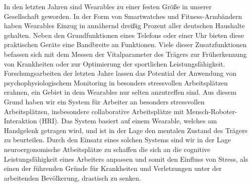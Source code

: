 

In den letzten Jahren sind Wearables zu einer festen Größe in unserer Gesellschaft geworden. In der Form von Smartwatches und Fitness-Armbändern haben Wearables Einzug in annähernd dreißig Prozent aller deutschen Haushalte gehalten. Neben den Grundfunktionen eines Telefons oder einer Uhr bieten diese praktischen Geräte eine Bandbreite an Funktionen. Viele dieser Zusatzfunktionen befassen sich mit dem Messen der Vitalparameter des Trägers zur Früherkennung von Krankheiten oder zur Optimierung der sportlichen Leistungsfähigkeit.
Forschungsarbeiten der letzten Jahre lassen das Potential der Anwendung von psychophysiologischem Monitoring in besonders stressvollen Arbeitsplätzen erahnen, ein Gebiet in dem Wearables nur selten anzutreffen sind.
Aus diesem Grund haben wir ein System für Arbeiter an besonders stressvollen Arbeitsplätzen, insbesondere collaborative Arbeitsplätze mit Mensch-Roboter-Interaktion (HRI). Das System basiert auf einem Wearable, welches am Handgelenk getragen wird, und ist in der Lage den mentalen Zustand des Trägers zu beurteilen.
Durch den Einsatz eines solchen Systems sind wir in der Lage neuroergonomische Atbeitsplätze zu schaffen die sich an die cognitive Leistungsfähigkeit eines Arbeiters anpassen und somit den Einfluss von Stress, als einen der führenden Gründe für Krankheiten und Verletzungen unter der arbeitenden Bevölkerung, drastisch zu senken.
